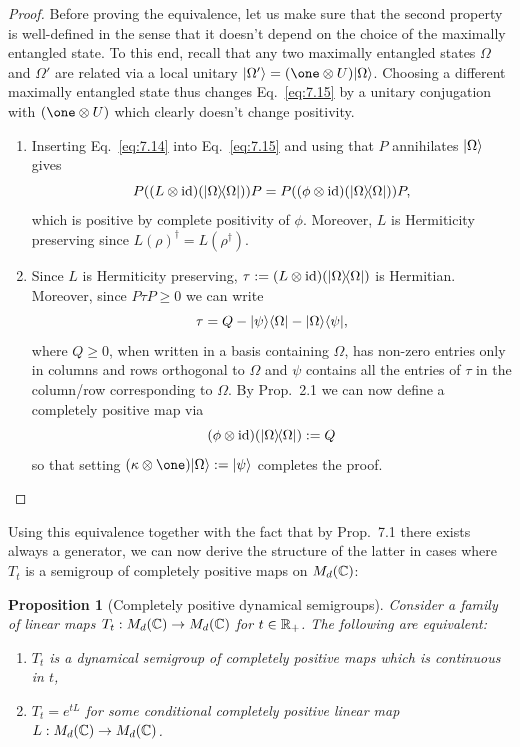 \documentclass[11pt,a4paper]{article}
\theoremstyle{plain}
\newtheorem{proposition}{Proposition}
\begin{document}
\begin{proof}
    Before proving the equivalence, let us make sure that the second property is well-defined in the sense that it doesn't depend on the choice of the maximally entangled state. To this end, recall that any two maximally entangled states $\Omega$ and $\Omega'$ are related via a local unitary $\ket{\Omega'}=(\one\otimes U)\ket{\Omega}$. Choosing a different maximally entangled state thus changes Eq.~\eqref{eq:7.15} by a unitary conjugation with $(\one\otimes U)$ which clearly doesn't change positivity.
    \begin{enumerate}
        \item[1.\ $\Rightarrow$ 2.:] Inserting Eq.~\eqref{eq:7.14} into Eq.~\eqref{eq:7.15} and using that $P$ annihilates $|\Omega\rangle$ gives
              \[
                  P((L\otimes\mathrm{id})(|\Omega\rangle\!\langle\Omega|))P
                  = P((\phi\otimes\mathrm{id})(|\Omega\rangle\!\langle\Omega|))P,
              \]
              which is positive by complete positivity of $\phi$. Moreover, $L$ is Hermiticity preserving since $L(\rho)^{\dagger}=L(\rho^{\dagger})$.
        \item[2.\ $\Rightarrow$ 1.:] Since $L$ is Hermiticity preserving, $\tau := (L\otimes\mathrm{id})(|\Omega\rangle\!\langle\Omega|)$ is Hermitian. Moreover, since $P\tau P\ge 0$ we can write
              \[
                  \tau = Q - |\psi\rangle\langle\Omega| - |\Omega\rangle\langle\psi|,
              \]
              where $Q\ge 0$, when written in a basis containing $\Omega$, has non-zero entries only in columns and rows orthogonal to $\Omega$ and $\psi$ contains all the entries of $\tau$ in the column/row corresponding to $\Omega$. By Prop.~2.1 we can now define a completely positive map via
              \[
                  (\phi\otimes\mathrm{id})(|\Omega\rangle\!\langle\Omega|) := Q
              \]
              so that setting $(\kappa\otimes\one)\ket{\Omega}:=\ket{\psi}$ completes the proof.
    \end{enumerate}
\end{proof}

Using this equivalence together with the fact that by Prop.~7.1 there exists always a generator, we can now derive the structure of the latter in cases where $T_t$ is a semigroup of completely positive maps on $M_d(\mathbb{C})$:

\begin{proposition}[Completely positive dynamical semigroups]
    Consider a family of linear maps $T_t:M_d(\mathbb{C})\to M_d(\mathbb{C})$ for $t\in\mathbb{R}_{+}$. The following are equivalent:
    \begin{enumerate}
        \item $T_t$ is a dynamical semigroup of completely positive maps which is continuous in $t$,
        \item $T_t=e^{tL}$ for some conditional completely positive linear map $L:M_d(\mathbb{C})\to M_d(\mathbb{C})$.
    \end{enumerate}
\end{proposition}
\end{document}

